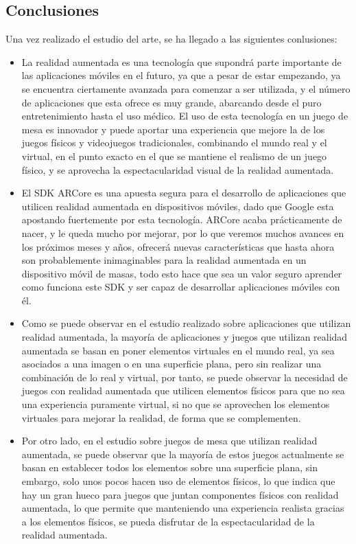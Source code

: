 \begin{itemize}
\begin{itemize}
\section{Conclusiones}
Una vez realizado el estudio del arte, se ha llegado a las siguientes conlusiones:
\begin{itemize}
  \item La realidad aumentada es una tecnología que supondrá parte importante de las aplicaciones móviles en el futuro, ya que a pesar de estar empezando, ya se encuentra ciertamente avanzada para comenzar a ser utilizada, y el número de aplicaciones que esta ofrece es muy grande, abarcando desde el puro entretenimiento hasta el uso médico. El uso de esta tecnología en un juego de mesa es innovador y puede aportar una experiencia que mejore la de los juegos físicos y videojuegos tradicionales, combinando el mundo real y el virtual, en el punto exacto en el que se mantiene el realismo de un juego físico, y se aprovecha la espectacularidad visual de la realidad aumentada.

  \item El SDK ARCore es una apuesta segura para el desarrollo de aplicaciones que utilicen realidad aumentada en dispositivos móviles, dado que Google esta apostando fuertemente por esta tecnología. ARCore acaba prácticamente de nacer, y le queda mucho por mejorar, por lo que veremos muchos avances en los próximos meses y años, ofrecerá nuevas características que hasta ahora son probablemente inimaginables para la realidad aumentada en un dispositivo móvil de masas, todo esto hace que sea un valor seguro aprender como funciona este SDK y ser capaz de desarrollar aplicaciones móviles con él.

  \item Como se puede observar en el estudio realizado sobre aplicaciones que utilizan realidad aumentada, la mayoría de aplicaciones y juegos que utilizan realidad aumentada se basan en poner elementos virtuales en el mundo real, ya sea asociados a una imagen o en una superficie plana, pero sin realizar una combinación de lo real y virtual, por tanto, se puede observar la necesidad de juegos con realidad aumentada que utilicen elementos físicos para que no sea una experiencia puramente virtual, si no que se aprovechen los elementos virtuales para mejorar la realidad, de forma que se complementen.

  \item Por otro lado, en el estudio sobre juegos de mesa que utilizan realidad aumentada, se puede observar que la mayoría de estos juegos actualmente se basan en establecer todos los elementos sobre una superficie plana, sin embargo, solo unos pocos hacen uso de elementos físicos, lo que indica que hay un gran hueco para juegos que juntan componentes físicos con realidad aumentada, lo que permite que manteniendo una experiencia realista gracias a los elementos físicos, se pueda disfrutar de la espectacularidad de la realidad aumentada.


\end{itemize}
\end{itemize}
\end{itemize}
